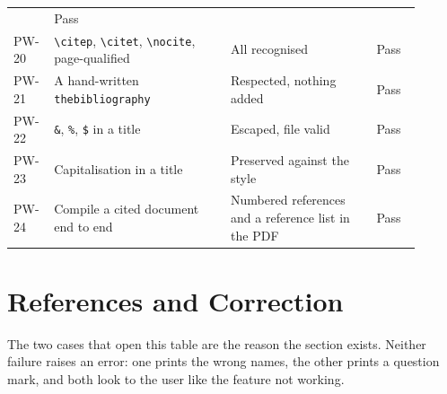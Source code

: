 \documentclass[12pt,a4paper]{report}
\begin{document}
\begin{longtable}{@{}p{0.07\linewidth}p{0.40\linewidth}p{0.33\linewidth}p{0.10\linewidth}@{}}
  & Pass \\
PW-20 & \verb|\citep|, \verb|\citet|, \verb|\nocite|, page-qualified
  & All recognised & Pass \\
PW-21 & A hand-written \texttt{thebibliography} & Respected, nothing added
  & Pass \\
PW-22 & \texttt{\&}, \texttt{\%}, \texttt{\$} in a title & Escaped, file valid
  & Pass \\
PW-23 & Capitalisation in a title & Preserved against the style & Pass \\
PW-24 & Compile a cited document end to end & Numbered references and a
  reference list in the PDF & Pass \\
\bottomrule
\end{longtable}

\section{References and Correction}

The two cases that open this table are the reason the section exists. Neither
failure raises an error: one prints the wrong names, the other prints a
question mark, and both look to the user like the feature not working.
\end{document}
